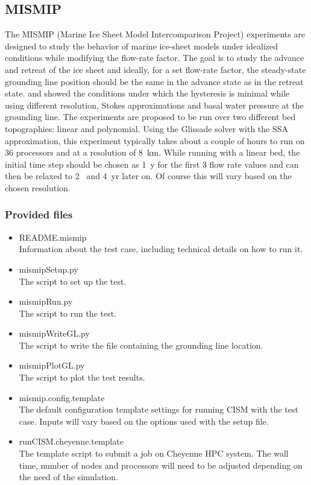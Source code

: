 \subsection{MISMIP}
\label{sc:mismip}
The MISMIP (Marine Ice Sheet Model Intercomparison Project) experiments \citep{Pattyn2012} are designed to study the behavior of marine ice-sheet models under idealized conditions while modifying the flow-rate factor. The goal is to study the advance and retreat of the ice sheet and ideally, for a set flow-rate factor, the steady-state grounding line position should be the same in the advance state as in the retreat state. \citet{Pattyn2012} and \citet{Leguy2014} showed the conditions under which the hysteresis is minimal while using different resolution, Stokes approximations and basal water pressure at the grounding line. The experiments are proposed to be run over two different bed topographies: linear and polynomial.
Using the Glissade solver with the SSA approximation, this experiment typically takes about a couple of hours to run on 36 processors and at a resolution of 8~km. While running with a linear bed, the initial time step should be chosen as 1~y for the first 3 flow rate values and can then be relaxed to 2~ and 4~yr later on. Of course this will vary based on the chosen resolution.

\subsubsection{Provided files}

\begin{itemize}
	\item README.mismip \\
		Information about the test case, including technical details on how to run it.
	\item mismipSetup.py \\
		The script to set up the test.
	\item mismipRun.py \\
		The script to run the test.
	\item mismipWriteGL.py \\
		The script to write the file containing the grounding line location.
	\item mismipPlotGL.py \\
		The script to plot the test results.		
	\item mismip.config.template \\
		The default configuration template settings for running CISM with the test case. Inputs will vary based on the options used with the setup file. 
	\item runCISM.cheyenne.template \\
		The template script to submit a job on Cheyenne HPC system. The wall time, number of nodes and processors will need to be adjusted depending on the need of the simulation. 
\end{itemize}

